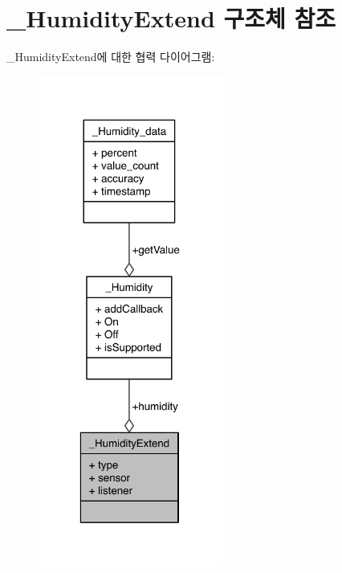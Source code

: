 \hypertarget{struct___humidity_extend}{\section{\-\_\-\-Humidity\-Extend 구조체 참조}
\label{struct___humidity_extend}
}


\-\_\-\-Humidity\-Extend에 대한 협력 다이어그램\-:\nopagebreak
\begin{figure}[H]
\begin{center}
\leavevmode
\includegraphics[width=172pt]{df/d33/struct___humidity_extend__coll__graph}
\end{center}
\end{figure}
